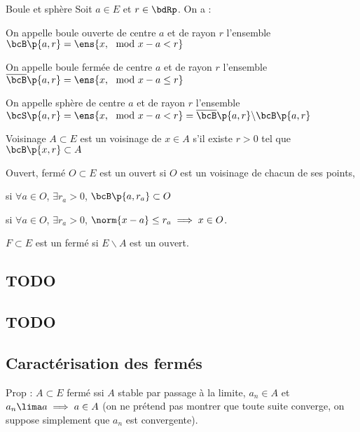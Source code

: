 \documentclass[a4paper,french,bookmarks]{book}
\begin{document}
    \begin{definition}{Boule et sphère}{}
        Soit $a \in E$ et $r \in \bdRp$. On a :
        \begin{enumerate}
            \itt On appelle boule ouverte de centre $a$ et de rayon $r$ l'ensemble $\bcB\p{a, r} = \ens{x, \mod{x - a} < r}$
            
            \itt On appelle boule fermée de centre $a$ et de rayon $r$ l'ensemble $\overline\bcB\p{a, r} = \ens{x, \mod{x - a} \leq r}$
            
            \itt On appelle sphère de centre $a$ et de rayon $r$ l'ensemble $\bcS\p{a, r} = \ens{x, \mod{x - a } < r} = \overline\bcB\p{a, r} \backslash \bcB\p{a, r}$
        \end{enumerate}
    \end{definition}
    \begin{definition}{Voisinage}{}
        $A \subset E$ est un voisinage de $x \in A$ s'il existe $r > 0$ tel que $\bcB\p{x, r} \subset A$
    \end{definition}
    \begin{definition}{Ouvert, fermé}{}
        $O \subset E$ est un ouvert si $O$ est un voisinage de chacun de ses points, \ie
        \begin{enumerate}
            \itast si $\forall a \in O$, $\exists r_a > 0$, $\bcB\p{a, r_a} \subset O$
            
            \itast si $\forall a \in O$, $\exists r_a > 0$, $\norm{x - a} \leq r_a \implies x \in O$.
        \end{enumerate}
        $F \subset E$ est un fermé si $E \backslash A$ est un ouvert.
    \end{definition}
    
    \subsection{TODO}
    
    \subsection{TODO}
    
    \subsection{Caractérisation des fermés}
    
    Prop : $A \subset E$ fermé ssi $A$ stable par passage à la limite, \ie $a_n \in A$ et $a_n \lima a \implies a \in A$ (on ne prétend pas montrer que toute suite converge, on suppose simplement que $a_n$ est convergente).
    
\end{document}
